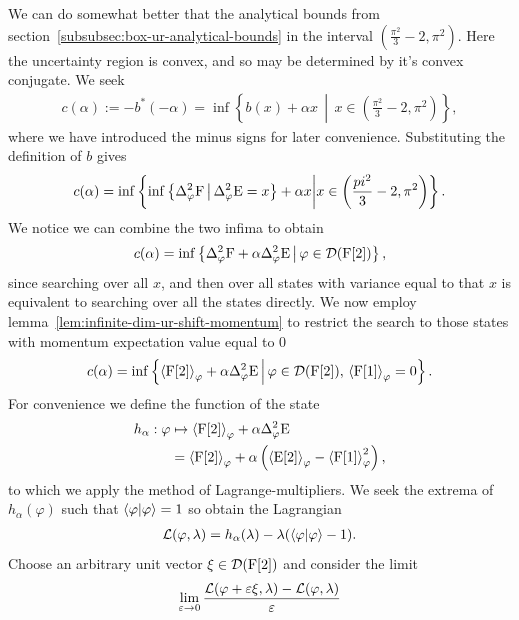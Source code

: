We can do somewhat better that the analytical bounds from section~\ref{subsubsec:box-ur-analytical-bounds} in the interval $\left(\frac{\pi^2}{3} -2,\pi^2\right)$. Here the uncertainty region is convex, and so may be determined by it's convex conjugate. We seek
\begin{align}
  c(\alpha) := -b^*(-\alpha) = \inf \left\{b(x) + \alpha x\,\middle|\,x\in\left(\frac{\pi^2}{3} -2,\pi^2\right)\right\},
\end{align}
where we have introduced the minus signs for later convenience. Substituting the definition of $b$ gives
\begin{align}
  c(\alpha) = \inf \left\{\inf\left\{\var[\varphi]{\opf}\,\middle|\,\var[\varphi]{\ope} = x \right\} + \alpha x\middle| x\in\left(\frac{pi^2}{3} -2,\pi^2\right)\right\}.
\end{align}
We notice we can combine the two infima to obtain
\begin{align}
  c(\alpha) = \inf\left\{\var[\varphi]{\opf} + \alpha \var[\varphi]{\ope}\,\middle|\,\varphi\in\dom{\opf[2]}\right\},
\end{align}
since searching over all $x$, and then over all states with variance equal to that $x$ is equivalent to searching over all the states directly. We now employ lemma~\ref{lem:infinite-dim-ur-shift-momentum} to restrict the search to those states with momentum expectation value equal to $0$
\begin{align}
  c(\alpha) = \inf\left\{\expe{\opf[2]}{\varphi} + \alpha \var[\varphi]{\ope}\,\middle|\,\varphi\in\dom{\opf[2]},\,\expe{\opf[1]}{\varphi} = 0\right\}.
\end{align}
For convenience we define the function of the state
\begin{align}
  h_{\alpha} : \varphi &\mapsto \expe{\opf[2]}{\varphi} + \alpha \var[\varphi]{\ope}\\
                    &= \expe{\opf[2]}{\varphi} + \alpha\left(\expe{\ope[2]}{\varphi} - \expe{\opf[1]}{\varphi}^2\right),
\end{align}
to which we apply the method of Lagrange-multipliers. We seek the extrema of $h_\alpha(\varphi)$ such that $\langle \varphi|\varphi\rangle = 1$ so obtain the Lagrangian
\begin{align}
  \mathcal{L}(\varphi,\lambda) = h_\alpha(\lambda) - \lambda(\langle \varphi|\varphi\rangle - 1).
\end{align}
Choose an arbitrary unit vector $\xi\in\mathcal{D}(\operatorname{F}[2])$ and consider the limit
\begin{align}
  \lim_{\varepsilon\to 0} \frac{\mathcal{L}(\varphi+ \varepsilon\xi, \lambda) - \mathcal{L}(\varphi,\lambda) }{\varepsilon} 
\end{align}


